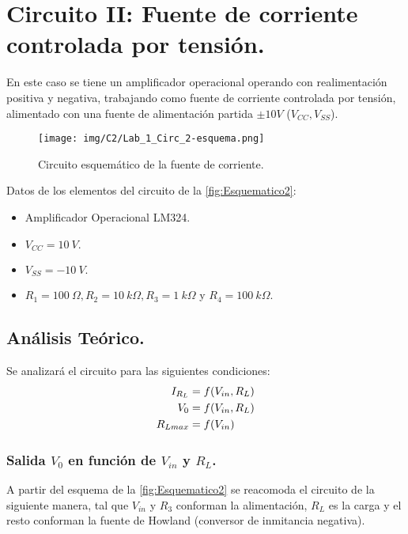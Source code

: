 \section{Circuito II: Fuente de corriente controlada por tensión.}

En este caso se tiene un amplificador operacional operando con realimentación positiva y negativa, trabajando como fuente de corriente controlada por tensión, alimentado con una fuente de alimentación partida $\pm10V$ ($V_{CC}, V_{SS}$).

\begin{figure}[H]
    \centering
    \texttt{[image: img/C2/Lab\_1\_Circ\_2-esquema.png]}
    \caption{Circuito esquemático de la fuente de corriente.}
    \label{fig:Esquematico2}
\end{figure}

Datos de los elementos del circuito de la \autoref{fig:Esquematico2}:
\begin{itemize}
    \item Amplificador Operacional LM324.
    \item $V_{CC}=10~V.$
    \item $V_{SS}=-10~V.$
    \item $R_1=100~\Omega, R_2=10~k\Omega, R_3=1~k\Omega$ y $R_4=100~k\Omega.$
\end{itemize}

\subsection{Análisis Teórico.}

Se analizará el circuito para las siguientes condiciones:
\begin{align}
    I_{R_L}&=f(V_{in},R_L) \label{eq:Consigna:I_{R_L}} \\
    V_0&=f(V_{in},R_L) \label{eq:Consigna:V_0} \\
    R_{Lmax}&=f(V_{in}) \label{eq:Consigna:R_L}
\end{align}

\subsubsection{Salida $V_0$ en función de $V_{in}$ y $R_L$.}
A partir del esquema de la \autoref{fig:Esquematico2} se reacomoda el circuito  de la siguiente manera, tal que $V_{in}$ y $R_3$ conforman la alimentación, $R_L$ es la carga y el resto conforman la fuente de Howland (conversor de inmitancia negativa).

